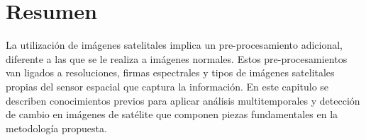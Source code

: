\section{Resumen}

La utilizaci\'on de im\'agenes satelitales implica un pre-procesamiento adicional, diferente a las que se le realiza a im\'agenes normales. Estos pre-procesamientos van ligados a resoluciones, firmas espectrales y tipos de im\'agenes satelitales propias del sensor espacial que captura la informaci\'on. En este capitulo se describen conocimientos previos para aplicar an\'alisis multitemporales y detecci\'on de cambio en im\'agenes de sat\'elite que componen piezas fundamentales en la metodolog\'ia propuesta.
